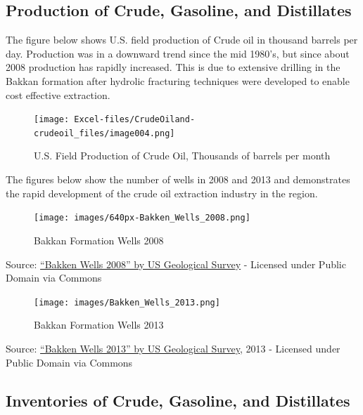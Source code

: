 \documentclass[
]{book}
\begin{document}
\hypertarget{production-of-crude-gasoline-and-distillates}{%
\subsection{Production of Crude, Gasoline, and Distillates}\label{production-of-crude-gasoline-and-distillates}}

The figure below shows U.S. field production of Crude oil in thousand barrels per day. Production was in a downward trend since the mid 1980's, but since about 2008 production has rapidly increased. This is due to extensive drilling in the Bakkan formation after hydrolic fracturing techniques were developed to enable cost effective extraction.

\begin{figure}
\centering
\texttt{[image: Excel-files/CrudeOiland-crudeoil\_files/image004.png]}
\caption{U.S. Field Production of Crude Oil, Thousands of barrels per month}
\end{figure}

The figures below show the number of wells in 2008 and 2013 and demonstrates the rapid development of the crude oil extraction industry in the region.

\begin{figure}
\centering
\texttt{[image: images/640px-Bakken\_Wells\_2008.png]}
\caption{Bakkan Formation Wells 2008}
\end{figure}

Source: \href{https://commons.wikimedia.org/wiki/File:Bakken_Wells_2008.png\#/media/File:Bakken_Wells_2008.png}{``Bakken Wells 2008'' by US Geological Survey} - Licensed under Public Domain via Commons

\begin{figure}
\centering
\texttt{[image: images/Bakken\_Wells\_2013.png]}
\caption{Bakkan Formation Wells 2013}
\end{figure}

Source: \href{https://commons.wikimedia.org/wiki/File:Bakken_Wells_2013.png\#/media/File:Bakken_Wells_2013.png}{``Bakken Wells 2013'' by US Geological Survey}, 2013 - Licensed under Public Domain via Commons

\hypertarget{inventories-of-crude-gasoline-and-distillates}{%
\subsection{Inventories of Crude, Gasoline, and Distillates}\label{inventories-of-crude-gasoline-and-distillates}}
\end{document}

